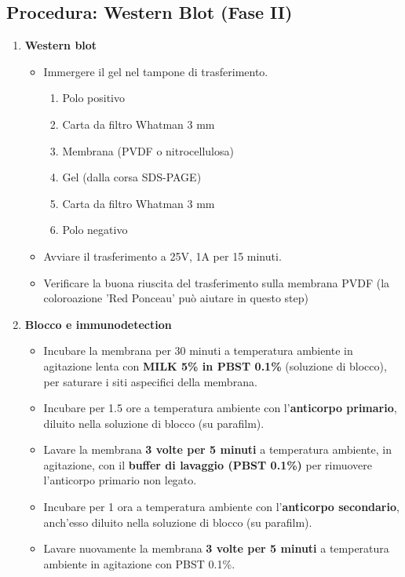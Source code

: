 \subsection{Procedura: Western Blot (Fase II)}
\begin{enumerate}
\item \textbf{Western blot}\footnotesize
    \begin{itemize}
      \item Immergere il gel nel tampone di trasferimento.
      \begin{enumerate}
        \item Polo positivo
        \item Carta da filtro Whatman 3 mm
        \item Membrana (PVDF o nitrocellulosa)
        \item Gel (dalla corsa SDS-PAGE)
        \item Carta da filtro Whatman 3 mm
        \item Polo negativo
      \end{enumerate}
      \item Avviare il trasferimento a 25V, 1A per 15 minuti.
      \item Verificare la buona riuscita del trasferimento sulla membrana PVDF (la coloroazione 'Red Ponceau' può aiutare in questo step)
    \end{itemize}



  
\item \footnotesize\textbf{Blocco e immunodetection}
  \begin{itemize}
    \item Incubare la membrana per 30 minuti a temperatura ambiente in agitazione lenta con \textbf{MILK 5\% in PBST 0.1\%} (soluzione di blocco), per saturare i siti aspecifici della membrana.
    \item Incubare per 1.5 ore a temperatura ambiente con l’\textbf{anticorpo primario}, diluito nella soluzione di blocco (su parafilm).
    \item Lavare la membrana \textbf{3 volte per 5 minuti} a temperatura ambiente, in agitazione, con il \textbf{buffer di lavaggio (PBST 0.1\%)} per rimuovere l’anticorpo primario non legato.
    \item Incubare per 1 ora a temperatura ambiente con l’\textbf{anticorpo secondario}, anch’esso diluito nella soluzione di blocco (su parafilm).
    \item Lavare nuovamente la membrana \textbf{3 volte per 5 minuti} a temperatura ambiente in agitazione con PBST 0.1\%.
  \end{itemize}
\end{enumerate}

